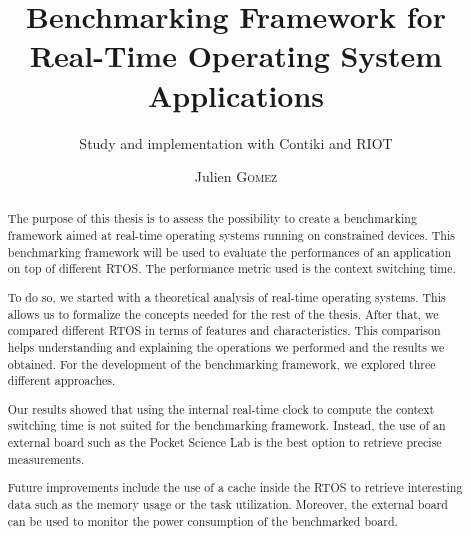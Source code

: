 \documentclass{EPL-master-thesis-covers-EN}
\title{Benchmarking Framework for Real-Time Operating System Applications}
\subtitle{Study and implementation with Contiki and RIOT}
\author{Julien \textsc{Gomez}}
\begin{document}
  \maketitle

\cleardoublepage
{}

 \begin{abstract}

    The purpose of this thesis is to assess the possibility to create a benchmarking framework aimed at 
      real-time operating systems running on constrained devices. 
    This benchmarking framework will be used to evaluate the performances of an application on top of different RTOS.
    The performance metric used is the context switching time.

    To do so, we started with a theoretical analysis of real-time operating systems.
    This allows us to formalize the concepts needed for the rest of the thesis.
    After that, we compared different RTOS in terms of features and characteristics.
    This comparison helps understanding and explaining the operations we performed and the results we obtained.
    For the development of the benchmarking framework, we explored three different approaches.
    
    Our results showed that using the internal real-time clock to compute the context switching time is not suited for the benchmarking framework.
    Instead, the use of an external board such as the Pocket Science Lab is the best option to retrieve precise measurements.

    Future improvements include the use of a cache inside the RTOS to retrieve interesting data such as the memory usage or the task utilization.
    Moreover, the external board can be used to monitor the power consumption of the benchmarked board.
    
 \end{abstract}
\end{document}
